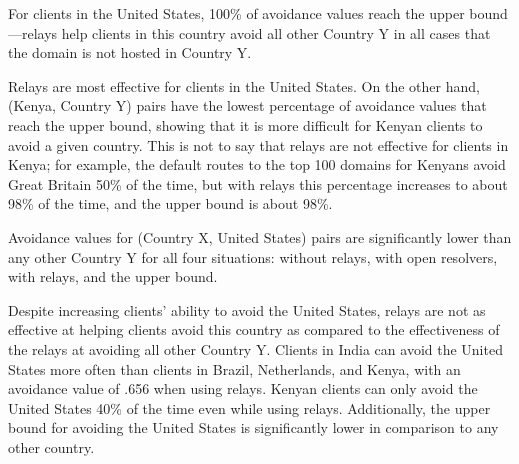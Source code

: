 \begin{finding}
For clients in the United States, 100\% of avoidance values reach the upper bound---relays help clients in this country avoid all other Country Y in all cases that the domain is not hosted in Country Y.  
\end{finding}
Relays are most effective for clients in the United States.  On the other hand, (Kenya, Country Y) pairs have the lowest percentage of avoidance values that reach the upper bound, showing that it is more difficult for Kenyan clients to avoid a given country.  This is not to say that relays are not effective for clients in Kenya; for example, the default routes to the top 100 domains for Kenyans avoid Great Britain 50\% of the time, but with relays this percentage increases to about 98\% of the time, and the upper bound is about 98\%. 

\begin{finding}
Avoidance values for (Country X, United States) pairs are significantly lower than any other Country Y for all four situations: without relays, with open resolvers, with relays, and the upper bound. 
\end{finding}

Despite increasing clients' ability to avoid the United States, relays are not as effective at helping clients avoid this country as compared to the effectiveness of the relays at avoiding all other Country Y.  Clients in India can avoid the United States more often than clients in Brazil, Netherlands, and Kenya, with an avoidance value of .656 when using relays.  Kenyan clients can only avoid the United States 40\% of the time even while using relays.  Additionally, the upper bound for avoiding the United States is significantly lower in comparison to any other country.  

